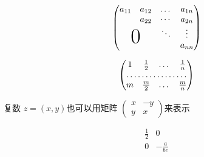 \documentclass{ctexart}
\begin{document}
		
	\[
	\begin{pmatrix}
	a_{11} & a_{12} & \dots & a_{1n}\\
	& a_{22} & \cdots & a_{2n}\\
	&        & \ddots & \vdots \\
	\multicolumn{2}{c}{\raisebox{1.3ex}[0pt]{\Huge 0}} &   & a_{nn}
	\end{pmatrix}
	\]
	
	
	\[
	\begin{pmatrix}
	1 & \frac 12 &\dots & \frac 1n\\
	\hdotsfor{4}\\
	m & \frac m2 & \dots & \frac mn
	\end{pmatrix}
	\]
	
	复数 $z = (x,y)$也可以用矩阵
	\begin{math}
	\left(%
	\begin{smallmatrix}
	x & -y \\ y & x
	\end{smallmatrix}
	\right) %
	\end{math}来表示
	
	
	\[
	\begin{array}{r|r}
	\frac{1}{2} & 0 \\  %
	\hline
	0 & -\frac{a}{bc}
	\end{array}
	\]
	
\end{document}
